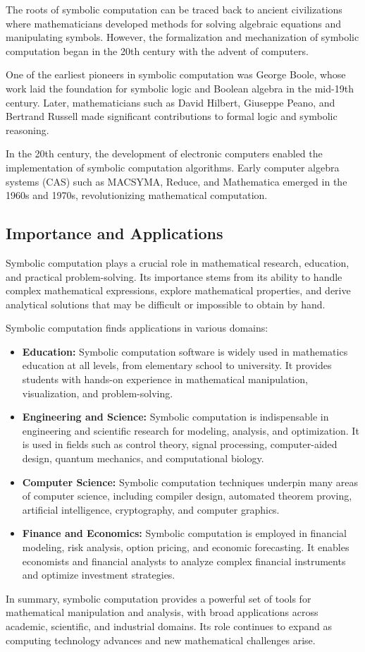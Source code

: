 The roots of symbolic computation can be traced back to ancient civilizations where mathematicians developed methods for solving algebraic equations and manipulating symbols. However, the formalization and mechanization of symbolic computation began in the 20th century with the advent of computers.

One of the earliest pioneers in symbolic computation was George Boole, whose work laid the foundation for symbolic logic and Boolean algebra in the mid-19th century. Later, mathematicians such as David Hilbert, Giuseppe Peano, and Bertrand Russell made significant contributions to formal logic and symbolic reasoning.

In the 20th century, the development of electronic computers enabled the implementation of symbolic computation algorithms. Early computer algebra systems (CAS) such as MACSYMA, Reduce, and Mathematica emerged in the 1960s and 1970s, revolutionizing mathematical computation.

\subsection{Importance and Applications}

Symbolic computation plays a crucial role in mathematical research, education, and practical problem-solving. Its importance stems from its ability to handle complex mathematical expressions, explore mathematical properties, and derive analytical solutions that may be difficult or impossible to obtain by hand.

Symbolic computation finds applications in various domains:
%
\begin{itemize}
  \item \textbf{Education:} Symbolic computation software is widely used in mathematics education at all levels, from elementary school to university. It provides students with hands-on experience in mathematical manipulation, visualization, and problem-solving.
  \item \textbf{Engineering and Science:} Symbolic computation is indispensable in engineering and scientific research for modeling, analysis, and optimization. It is used in fields such as control theory, signal processing, computer-aided design, quantum mechanics, and computational biology.
  \item \textbf{Computer Science:} Symbolic computation techniques underpin many areas of computer science, including compiler design, automated theorem proving, artificial intelligence, cryptography, and computer graphics.
  \item \textbf{Finance and Economics:} Symbolic computation is employed in financial modeling, risk analysis, option pricing, and economic forecasting. It enables economists and financial analysts to analyze complex financial instruments and optimize investment strategies.
\end{itemize}
%
In summary, symbolic computation provides a powerful set of tools for mathematical manipulation and analysis, with broad applications across academic, scientific, and industrial domains. Its role continues to expand as computing technology advances and new mathematical challenges arise.

